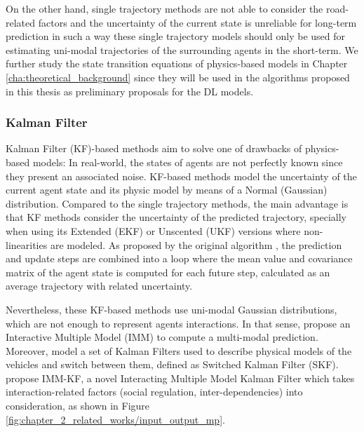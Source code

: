 
On the other hand, single trajectory methods are not able to consider the road-related factors and the uncertainty of the current state is unreliable for long-term prediction in such a way these single trajectory models should only be used for estimating uni-modal trajectories of the surrounding agents in the short-term. We further study the state transition equations of physics-based models in Chapter \ref{cha:theoretical_background} since they will be used in the algorithms proposed in this thesis as preliminary proposals for the \ac{DL} models.

\subsubsection{Kalman Filter}
\label{subsubsec:2_kalman_filter_mp}

Kalman Filter (KF)-based methods aim to solve one of drawbacks of physics-based models: In real-world, the states of agents are not perfectly known since they present an associated noise. KF-based methods model the uncertainty of the current agent state and its physic model by means of a Normal (Gaussian) distribution. Compared to the single trajectory methods, the main advantage is that KF methods consider the uncertainty of the predicted trajectory, specially when using its Extended (EKF) or Unscented (UKF) versions where non-linearities are modeled. As proposed by the original algorithm \cite{kalman1960new}, the prediction and update steps are combined into a loop where the mean value and covariance matrix of the agent state is computed for each future step, calculated as an average trajectory with related uncertainty. 

Nevertheless, these KF-based methods use uni-modal Gaussian distributions, which are not enough to represent agents interactions. In that sense, \cite{kaempchen2004imm} propose an Interactive Multiple Model (IMM) to compute a multi-modal prediction. Moreover, \cite{jin2015switched} model a set of Kalman Filters used to describe physical models of the vehicles and switch between them, defined as Switched Kalman Filter (SKF). \cite{lefkopoulos2020interaction} propose IMM-KF, a novel Interacting Multiple Model Kalman Filter which takes interaction-related factors (social regulation, inter-dependencies) into consideration, as shown in Figure \ref{fig:chapter_2_related_works/input_output_mp}.

